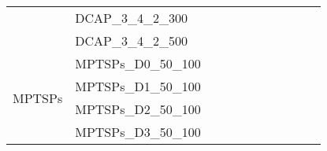 \begin{table}[]
{\begin{tabular}{|c|l|ll|ll|ll|l|l|l|}
			& DCAP\_3\_4\_2\_300            &                                   &                                  &                           &                          &                           &                          &                                       &                               & \\
			& DCAP\_3\_4\_2\_500            &                                   &                                  &                           &                          &                           &                          &                                       &                               & \\
			\hline
			\multirow{4}{*}{MPTSPs} & MPTSPs\_D0\_50\_100           &                                   &                                  &                           &                          &                           &                          &                                       &                               & \\
			& MPTSPs\_D1\_50\_100           &                                   &                                  &                           &                          &                           &                          &                                       &                               & \\
			& MPTSPs\_D2\_50\_100           &                                   &                                  &                           &                          &                           &                          &                                       &                               & \\
			& MPTSPs\_D3\_50\_100           &                                   &                                  &                           &                          &                           &                          &                                       &                               & \\

\end{tabular}}
\end{table}
